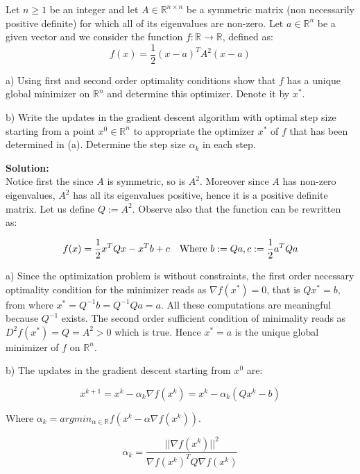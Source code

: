\documentclass[12pt]{article}
\begin{document}
	Let $n \geq 1$ be an integer and let $A \in \mathbb{R}^{n \times n}$ be a symmetric matrix (non necessarily positive definite) for which all of its eigenvalues are non-zero. Let $a \in \mathbb{R}^n$ be a given vector and we consider the function $f:\mathbb{R} \rightarrow \mathbb{R}$, defined as:
	\begin{equation}
		f(x) = \frac{1}{2}(x-a)^TA^2(x-a)
	\end{equation}
	
	a) Using first and second order optimality conditions show that $f$ has a unique global minimizer on $\mathbb{R}^n$ and determine this optimizer. Denote it by $x^*$.
	
	b) Write the updates in the gradient descent algorithm with optimal step size starting from a point $x^0 \in \mathbb{R}^n$ to appropriate the optimizer $x^*$ of $f$ that has been determined in (a). Determine the step size $\alpha_k$ in each step.
	
	\begin{framed}
		\textbf{Solution:}\\
		Notice first the since $A$ is symmetric, so is $A^2$. Moreover since $A$ has non-zero eigenvalues, $A^2$ has all its eigenvalues positive, hence it is a positive definite matrix. Let us define $Q := A^2$. Observe also that the function can be rewritten as:
		
		\begin{equation}
			f(x) = \frac{1}{2}x^TQx - x^Tb + c \text{\quad Where } b := Qa, c := \frac{1}{2}a^TQa
		\end{equation}

		a) Since the optimization problem is without constraints, the first order necessary optimality condition for the minimizer reads as $\nabla f(x^*) = 0$, that is $Qx^* = b$, from where $x^* = Q^{-1}b = Q^{-1}Qa = a$. All these computations are meaningful because $Q^{-1}$ exists. The second order sufficient condition of minimality reads as $D^2f(x^*) = Q = A^2 > 0$ which is true. Hence $x^* = a$ is the unique global minimizer of $f$ on $\mathbb{R}^n$.
		
		b) The updates in the gradient descent starting from $x^0$ are:
		
		\begin{equation}
			x^{k+1} = x^{k} - \alpha_k \nabla f(x^k) = x^k - \alpha_k (Qx^k - b)
		\end{equation}
		
		Where $\alpha_k = argmin_{\alpha \in \mathbb{R}} f(x^k - \alpha \nabla f(x^k))$. 
		
		\begin{equation}
			\alpha_k = \frac{||\nabla f(x^k)||^2}{\nabla f(x^k)^T Q \nabla f(x^k)}
		\end{equation}

	\end{framed}
	
\end{document}
